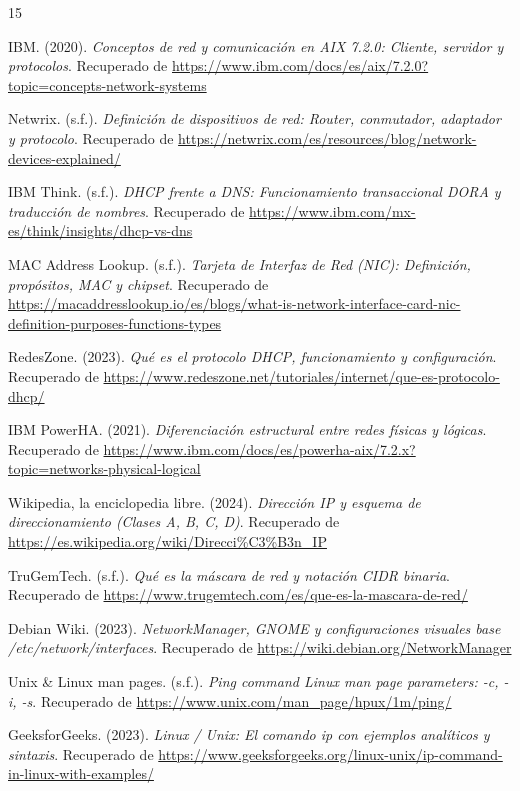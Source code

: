 \documentclass[a4paper,12pt]{article}
\begin{document}
\begin{thebibliography}{15}

 IBM. (2020). \textit{Conceptos de red y comunicación en AIX 7.2.0: Cliente, servidor y protocolos}. Recuperado de \url{https://www.ibm.com/docs/es/aix/7.2.0?topic=concepts-network-systems}

 Netwrix. (s.f.). \textit{Definición de dispositivos de red: Router, conmutador, adaptador y protocolo}. Recuperado de \url{https://netwrix.com/es/resources/blog/network-devices-explained/}

 IBM Think. (s.f.). \textit{DHCP frente a DNS: Funcionamiento transaccional DORA y traducción de nombres}. Recuperado de \url{https://www.ibm.com/mx-es/think/insights/dhcp-vs-dns}

 MAC Address Lookup. (s.f.). \textit{Tarjeta de Interfaz de Red (NIC): Definición, propósitos, MAC y chipset}. Recuperado de \url{https://macaddresslookup.io/es/blogs/what-is-network-interface-card-nic-definition-purposes-functions-types}

 RedesZone. (2023). \textit{Qué es el protocolo DHCP, funcionamiento y configuración}. Recuperado de \url{https://www.redeszone.net/tutoriales/internet/que-es-protocolo-dhcp/}

 IBM PowerHA. (2021). \textit{Diferenciación estructural entre redes físicas y lógicas}. Recuperado de \url{https://www.ibm.com/docs/es/powerha-aix/7.2.x?topic=networks-physical-logical}

 Wikipedia, la enciclopedia libre. (2024). \textit{Dirección IP y esquema de direccionamiento (Clases A, B, C, D)}. Recuperado de \url{https://es.wikipedia.org/wiki/Direcci\%C3\%B3n_IP}

 TruGemTech. (s.f.). \textit{Qué es la máscara de red y notación CIDR binaria}. Recuperado de \url{https://www.trugemtech.com/es/que-es-la-mascara-de-red/}

 Debian Wiki. (2023). \textit{NetworkManager, GNOME y configuraciones visuales base /etc/network/interfaces}. Recuperado de \url{https://wiki.debian.org/NetworkManager}

 Unix \& Linux man pages. (s.f.). \textit{Ping command Linux man page parameters: -c, -i, -s}. Recuperado de \url{https://www.unix.com/man_page/hpux/1m/ping/}

 GeeksforGeeks. (2023). \textit{Linux / Unix: El comando ip con ejemplos analíticos y sintaxis}. Recuperado de \url{https://www.geeksforgeeks.org/linux-unix/ip-command-in-linux-with-examples/}


\end{thebibliography}
\end{document}
